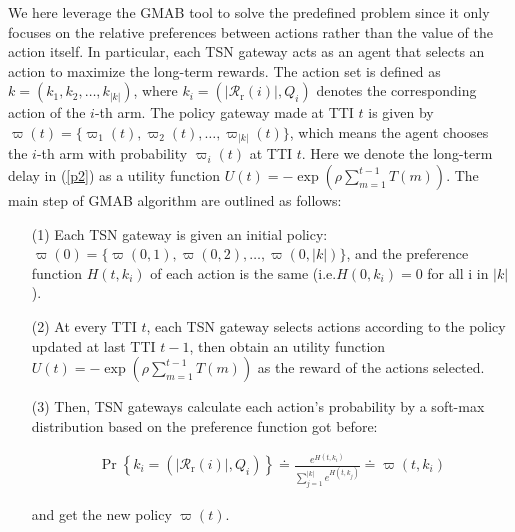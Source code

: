 \documentclass{SCIS2021}
\begin{document}
	\par We here leverage the GMAB tool to solve the predefined problem since it only focuses on the relative preferences between actions rather than the value of the action itself. In particular, each TSN gateway acts as an agent that selects an action to maximize the long-term rewards. The action set is defined as $k=\left(k_{1}, k_{2}, \ldots, k_{\left|k\right|}\right)$, where $k_{i}=\left(\left|\mathcal{R}_{\mathrm{r}}(i)\right|, Q_{i}\right)$ denotes the corresponding action of the $i$-th arm. The policy gateway made at TTI $t$ is given by $\varpi(t)=\{\varpi_{1}(t), \varpi_{2}(t), \ldots, \varpi_{\left|k\right|}(t)\}$, which means the agent chooses the $i$-th arm with probability $\varpi_{i}(t)$ at TTI $t$. Here we denote the long-term delay in (\ref{p2}) as a utility function $U(t) =-\exp (\rho \sum_{m=1}^{t-1} T(m))$. The main step of GMAB algorithm are outlined as follows:
	
	
	\begin{itemize}[itemsep= 15 pt,topsep = -1.5 pt]
		\item[(1)]
		Each TSN gateway is given an initial policy: $\varpi(0)=\{\varpi(0,1), \varpi(0,2), \ldots, \varpi(0,\left|k\right|)\}$, and the preference function $H(t,k_{i})$ of each action is the same (i.e.$H(0,k_{i})=0$ for all i in $|k|$).
	\end{itemize}
	
	\begin{itemize}[itemsep= 15 pt,topsep = -1.5 pt]
		\item[(2)]
		At every TTI $t$, each TSN gateway selects actions according to the policy updated at last TTI $t-1$, then obtain an utility function $U(t) =-\exp (\rho \sum_{m=1}^{t-1} T(m))$ as the reward of the actions selected.
	\end{itemize}
	
	\begin{itemize}[itemsep= 15 pt,topsep = -1.5 pt]
		\item[(3)]
		Then, TSN gateways calculate each action's probability by a soft-max distribution based on the preference function got before:\\
		\setlength\abovedisplayskip{-20pt}
		\begin{center}
			\begin{equation}
				\begin{aligned}
					\operatorname{Pr}\left\{k_{i}=\left(\left|\mathcal{R}_{\mathrm{r}}(i)\right|, Q_{i}\right)\right\} \doteq \frac{e^{H(t,k_{i})}}{\sum_{j=1}^{\left|k\right|} e^{H(t,k_{j})}} \doteq \varpi(t,k_{i})
				\end{aligned}
			\end{equation}
		\end{center}
		\setlength\belowdisplayskip{-15pt}
		\vspace{-6pt}
		and get the new policy  $\varpi(t)$.	
	\end{itemize}
	
\end{document}
